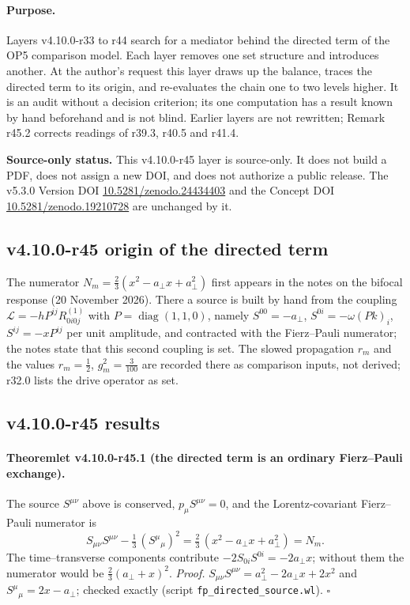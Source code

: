 \paragraph{Purpose.}
Layers v4.10.0-r33 to r44 search for a mediator behind the directed term of the OP5 comparison model.  Each layer removes one set structure
and introduces another.  At the author's request this layer draws up the balance, traces the directed term to its origin, and re-evaluates the
chain one to two levels higher.  It is an audit without a decision criterion; its one computation has a result known by hand beforehand and
is not blind.  Earlier layers are not rewritten; Remark r45.2 corrects readings of r39.3, r40.5 and r41.4.

\noindent\textbf{Source-only status.}
This v4.10.0-r45 layer is source-only.  It does not build a PDF, does not assign a new DOI,
and does not authorize a public release.  The v5.3.0 Version DOI
\href{https://doi.org/10.5281/zenodo.24434403}{10.5281/zenodo.24434403} and the Concept DOI
\href{https://doi.org/10.5281/zenodo.19210728}{10.5281/zenodo.19210728} are unchanged by it.

\subsection*{v4.10.0-r45 origin of the directed term}
\label{subsec:v4100-r45-origin}

The numerator \(N_m=\tfrac23(x^2-a_\perp x+a_\perp^2)\) first appears in the notes on the bifocal response (20 November 2026).  There a source is built by
hand from the coupling \(\mathcal L=-hP^{ij}R^{(1)}_{0i0j}\) with \(P=\operatorname{diag}(1,1,0)\), namely \(S^{00}=-a_\perp\), \(S^{0i}=-\omega(Pk)_i\), \(S^{ij}=-xP^{ij}\) per unit
amplitude, and contracted with the Fierz--Pauli numerator; the notes state that this second coupling is set.  The slowed propagation \(r_m\) and the
values \(r_m=\tfrac12\), \(g_m^2=\tfrac3{100}\) are recorded there as comparison inputs, not derived; r32.0 lists the drive operator as set.

\subsection*{v4.10.0-r45 results}
\label{subsec:v4100-r45-results}

\paragraph{Theoremlet v4.10.0-r45.1 (the directed term is an ordinary Fierz--Pauli exchange).}
The source \(S^{\mu\nu}\) above is conserved, \(p_\mu S^{\mu\nu}=0\), and the Lorentz-covariant Fierz--Pauli numerator is
\[
 S_{\mu\nu}S^{\mu\nu}-\tfrac13\,(S^\mu{}_\mu)^2=\tfrac23\,(x^2-a_\perp x+a_\perp^2)=N_m .
\]
The time--transverse components contribute \(-2S_{0i}S^{0i}=-2a_\perp x\); without them the numerator would be \(\tfrac23(a_\perp+x)^2\).
\emph{Proof.} \(S_{\mu\nu}S^{\mu\nu}=a_\perp^2-2a_\perp x+2x^2\) and \(S^\mu{}_\mu=2x-a_\perp\); checked exactly (script \texttt{fp\_\allowbreak directed\_\allowbreak source.wl}).  \(\square\)

